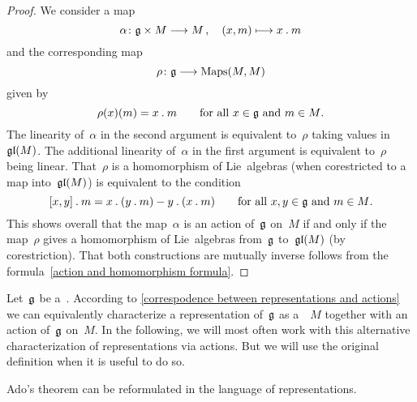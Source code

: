 \begin{proof}
	We consider a map
	\[
		\alpha
		\colon
		\glie \times M
		\to
		M \,,
		\quad
		(x,m)
		\mapsto
		x \act m
	\]
	and the corresponding map
	\[
		\rho
		\colon
		\glie
		\to
		\Maps(M,M)
	\]
	given by
	\begin{equation}
		\label{action and homomorphism formula}
		\rho(x)(m) = x \mathbin{.} m
		\qquad
		\text{for all~$x \in \mathfrak{g}$ and~$m \in M$.}
	\end{equation}
	The linearity of~$\alpha$ in the second argument is equivalent to~$\rho$ taking values in~$\mathfrak{gl}(M)$.
	The additional linearity of~$\alpha$ in the first argument is equivalent to~$\rho$ being linear.
	That~$\rho$ is a homomorphism of Lie~algebras (when corestricted to a map into~$\mathfrak{gl}(M)$) is equivalent to the condition
	\[
		[x,y] \mathbin{.} m
		=
		x \mathbin{.} (y \mathbin{.} m) - y \mathbin{.} (x \mathbin{.} m)
		\qquad
		\text{for all~$x, y \in \mathfrak{g}$ and~$m \in M$.}
	\]
	This shows overall that the map~$\alpha$ is an action of~$\mathfrak{g}$ on~$M$ if and only if the map~$\rho$ gives a homomorphism of Lie~algebras from~$\mathfrak{g}$ to~$\mathfrak{gl}(M)$ (by corestriction).
	That both constructions are mutually inverse follows from the formula~\eqref{action and homomorphism formula}.
\end{proof}


\begin{fluff}
	Let~$\mathfrak{g}$ be a~\liealgebra{$\kf$}.
	According to \cref{correspodence between representations and actions} we can equivalently characterize a representation of~$\mathfrak{g}$ as a~\vectorspace{$\kf$}~$M$ together with an action of~$\mathfrak{g}$ on~$M$.
	In the following, we will most often work with this alternative characterization of representations via actions.
	But we will use the original definition when it is useful to do so.
\end{fluff}




\begin{fluff}
	Ado’s theorem can be reformulated in the language of representations.
\end{fluff}


